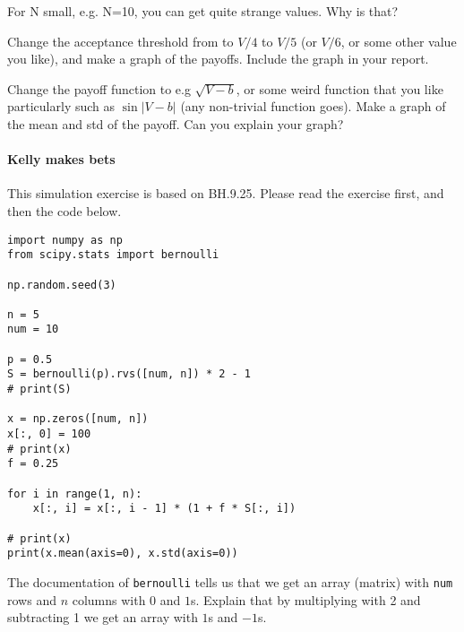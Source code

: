 \documentclass[assignments]{subfiles}
\begin{document}
\begin{exercise}
For N small, e.g. N=10, you can get quite strange values. Why is that?
\begin{solution}
\end{solution}
\end{exercise}


\begin{exercise}
Change the acceptance threshold from to $V/4$ to $V/5$ (or $V/6$, or some other value you like), and make a graph of the payoffs.
Include the graph in your report.
\begin{solution}
\end{solution}
\end{exercise}

\begin{exercise}
Change the payoff function to e.g $\sqrt{V-b}$, or some weird function that you like particularly such as $\sin |V-b|$ (any non-trivial function goes).
Make a graph of the  mean and std of the payoff. Can you explain your graph?
\begin{solution}
\end{solution}
\end{exercise}

\paragraph{Kelly makes bets}

This simulation exercise is based on BH.9.25.  Please read the exercise first, and then the code below.



\begin{verbatim}
import numpy as np
from scipy.stats import bernoulli

np.random.seed(3)

n = 5
num = 10

p = 0.5
S = bernoulli(p).rvs([num, n]) * 2 - 1
# print(S)

x = np.zeros([num, n])
x[:, 0] = 100
# print(x)
f = 0.25

for i in range(1, n):
    x[:, i] = x[:, i - 1] * (1 + f * S[:, i])

# print(x)
print(x.mean(axis=0), x.std(axis=0))
\end{verbatim}

\begin{exercise}
The documentation of \texttt{bernoulli} tells us that we get an array (matrix) with \texttt{num} rows and $n$ columns with $0$ and $1$s. Explain that by multiplying with 2 and subtracting 1 we get an array with $1$s and $-1$s.
\begin{solution}
\end{solution}
\end{exercise}
\end{document}
